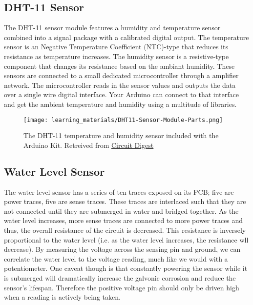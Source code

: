     \subsection*{DHT-11 Sensor}
    The DHT-11 sensor module features a humidity and temperature sensor combined into a signal package with a calibrated digital output.
    The temperature sensor is an Negative Temperature Coefficient (NTC)-type that reduces its resistance as temperature increases.
    The humidity sensor is a resistive-type component that changes its resistance based on the ambiant humidity.
    These sensors are connected to a small dedicated microcontroller through a amplifier network.
    The microcontroller reads in the sensor values and outputs the data over a single wire digital interface.
    Your Arduino can connect to that interface and get the ambient temperature and humidity using a multitude of libraries.
    
    \begin{figure}[h!]
        \texttt{[image: learning\_materials/DHT11-Sensor-Module-Parts.png]}
        \caption[DHT-11 Sensor]{The DHT-11 temperature and humidity sensor included with the Arduino Kit. 
        Retreived from \href{https://circuitdigest.com/sites/default/files/inlineimages/u4/DHT11-Sensor-Module-Parts.png}
        {Circuit Digest}}
    \end{figure}

    \subsection*{Water Level Sensor}
    The water level sensor has a series of ten traces exposed on its PCB; five are power traces, five are sense traces.
    These traces are interlaced such that they are not connected until they are submerged in water and bridged together.
    As the water level increases, more sense traces are connected to more power traces and thus, the overall resistance of the circuit is decreased.
    This resistance is inversely proportional to the water level (i.e. as the water level increases, the resistance wll decrease).
    By measuring the voltage across the sensing pin and ground, we can correlate the water level to the voltage reading, much like we would with a potentiometer.
    One caveat though is that constantly powering the sensor while it is submerged will dramatically increase the galvonic corrosion and reduce the sensor's lifespan.
    Therefore the positive voltage pin should only be driven high when a reading is actively being taken.

